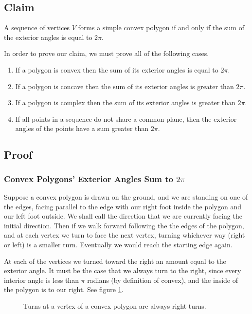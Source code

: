 \documentclass{article}
\begin{document}
\subsection{Claim}

A sequence of vertices \(V\) forms a simple convex polygon if and only if the sum of the exterior angles is equal to \(2\pi\).

In order to prove our claim, we must prove all of the following cases.
\begin{enumerate}
	\item If a polygon is convex then the sum of its exterior angles is equal to \(2\pi\).
	\item If a polygon is concave then the sum of its exterior angles is greater than \(2\pi\).
	\item If a polygon is complex then the sum of its exterior angles is greater than \(2\pi\).
	\item If all points in a sequence do not share a common plane, then the exterior angles of the points have a sum greater than \(2\pi\).
\end{enumerate}

\subsection{Proof}

\subsubsection{Convex Polygons' Exterior Angles Sum to \(2\pi\)}

Suppose a convex polygon is drawn on the ground, and we are standing on one of the edges, facing parallel to the edge with our right foot inside the polygon and our left foot outside. We shall call the direction that we are currently facing the initial direction. Then if we walk forward following the the edges of the polygon, and at each vertex we turn to face the next vertex, turning whichever way (right or left) is a smaller turn. Eventually we would reach the starting edge again.

At each of the vertices we turned toward the right an amount equal to the exterior angle. It must be the case that we always turn to the right, since every interior angle is less than \(\pi\) radians (by definition of convex), and the inside of the polygon is to our right. See figure \ref{walk-1}.

\begin{figure}[htbp]
	\centering
	\caption{Turns at a vertex of a convex polygon are always right turns.}
	\label{walk-1}
\end{figure}
\end{document}
